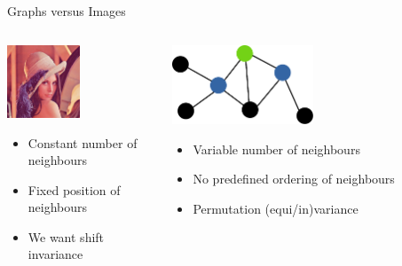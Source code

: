 \documentclass[11pt]{beamer}
\begin{document}
\begin{frame}{Graphs versus Images  }

  \begin{columns}
    \begin{column}{0.45\textwidth}
      \begin{center}
        \includegraphics[width=0.5\textwidth]{lenna}
      \end{center}
      \begin{itemize}
      \item Constant number of neighbours
      \item Fixed position of neighbours
      \item We want shift invariance
      \end{itemize}
    \end{column}
    \begin{column}{0.55\textwidth}
      \begin{center}
        \includegraphics[width=0.5\textwidth]{simple_graph}
      \end{center}
      \vspace{1cm}
      \begin{itemize}
      \item Variable number of neighbours
      \item No predefined ordering of neighbours
      \item Permutation (equi/in)variance
      \end{itemize}
    \end{column}
  \end{columns}
\end{frame}
\end{document}
